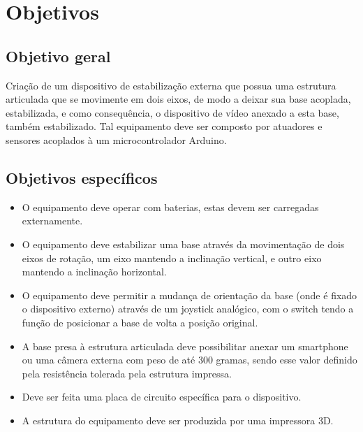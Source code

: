 \section{Objetivos}

    \subsection{Objetivo geral}
    Criação de um dispositivo de estabilização externa que possua uma estrutura articulada que se movimente em dois eixos, de modo a deixar sua base acoplada, estabilizada, e como consequência, o dispositivo de vídeo anexado a esta base, também estabilizado. Tal equipamento deve ser composto por atuadores e sensores acoplados à um microcontrolador Arduino.
    
    \subsection{Objetivos específicos}
    
        \begin{itemize}
            \item O equipamento deve operar com baterias, estas devem ser carregadas externamente.
            \item O equipamento deve estabilizar uma base através da movimentação de dois eixos de rotação, um eixo mantendo a inclinação vertical, e outro eixo mantendo a inclinação horizontal.
            \item O equipamento deve permitir a mudança de orientação da base (onde é fixado o dispositivo externo) através de um joystick analógico, com o switch tendo a função de posicionar a base de volta a posição original.
            \item A base presa à estrutura articulada deve possibilitar anexar um smartphone ou uma câmera externa com peso de até 300 gramas, sendo esse valor definido pela resistência tolerada pela estrutura impressa.
            \item Deve ser feita uma placa de circuito específica para o dispositivo.
            \item A estrutura do equipamento deve ser produzida por uma impressora 3D.
        \end{itemize}